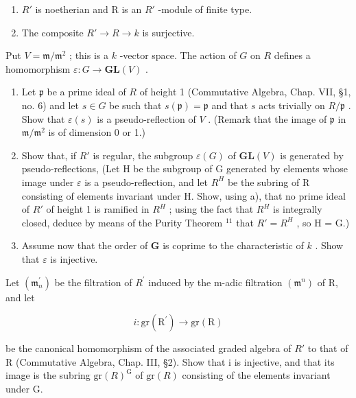 \begin{enumerate}
\def\labelenumi{(\roman{enumi})}
\item
  \(R'\) is noetherian and R is an \(R'\) -module of finite type.
\item
  The composite \(R'\to R\to k\) is surjective.
\end{enumerate}

Put \(V = \mathfrak{m} / \mathfrak{m}^2\) ; this is a \(k\) -vector space. The action of \(G\) on \(R\) defines a homomorphism \(\varepsilon : G \to \mathbf{GL}(V)\) .

\begin{enumerate}
\def\labelenumi{\alph{enumi})}
\item
  Let \(\mathfrak{p}\) be a prime ideal of \(R\) of height 1 (Commutative Algebra, Chap. VII, §1, no. 6) and let \(s \in G\) be such that \(s(\mathfrak{p}) = \mathfrak{p}\) and that \(s\) acts trivially on \(R / \mathfrak{p}\) . Show that \(\varepsilon(s)\) is a pseudo-reflection of \(V\) . (Remark that the image of \(\mathfrak{p}\) in \(\mathfrak{m} / \mathfrak{m}^2\) is of dimension 0 or 1.)
\item
  Show that, if \(R'\) is regular, the subgroup \(\varepsilon(G)\) of \(\mathbf{GL}(V)\) is generated by pseudo-reflections, (Let H be the subgroup of G generated by elements whose image under \(\varepsilon\) is a pseudo-reflection, and let \(R^{H}\) be the subring of R consisting of elements invariant under H. Show, using a), that no prime ideal of \(R'\) of height 1 is ramified in \(R^{H}\) ; using the fact that \(R^{H}\) is integrally closed, deduce by means of the Purity Theorem \(^{11}\) that \(R' = R^{H}\) , so H = G.)
\item
  Assume now that the order of \(\mathbf{G}\) is coprime to the characteristic of \(k\) . Show that \(\varepsilon\) is injective.
\end{enumerate}

Let \((\mathfrak{m}_{n}^{\prime})\) be the filtration of \(R^{\prime}\) induced by the m-adic filtration \((\mathfrak{m}^{n})\) of R, and let

\[
i: \mathrm{gr} (\mathrm{R} ^ {\prime}) \to \mathrm{gr} (\mathrm{R})
\]

be the canonical homomorphism of the associated graded algebra of \(R'\) to that of R (Commutative Algebra, Chap. III, §2). Show that i is injective, and that its image is the subring \(\mathrm{gr}(R)^{\mathrm{G}}\) of \(\mathrm{gr}(R)\) consisting of the elements invariant under G.


